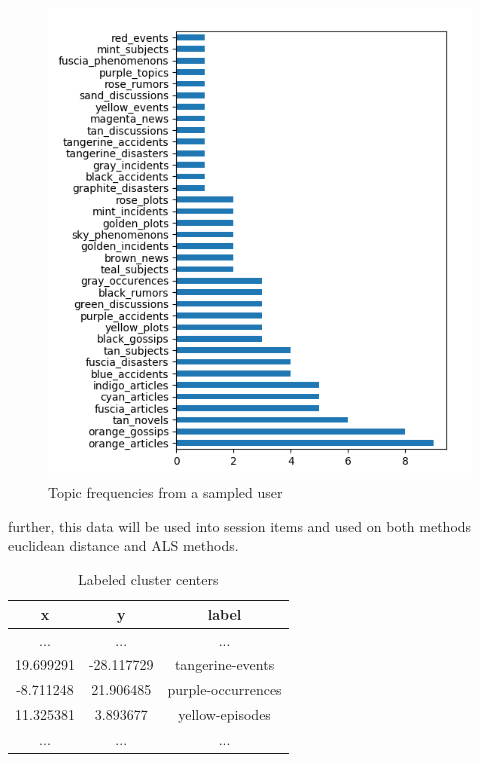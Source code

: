 \documentclass[ecp,tc,english]{iiufrgs}
\begin{document}
        \begin{figure}[!ht]
            \centering
            \includegraphics{images/frequencies.png}
            \caption{Topic frequencies from a sampled user}
            \label{fig:topic_frequency}
        \end{figure}
        
    
        further, this data will be used into session items and used on both methods euclidean distance and ALS methods.
        
        \begin{table}[!ht]
            \centering
                \begin{tabular}{ |c|c|c| } 
                \hline
                x & y & label \\
                \hline 
                ... & ...  & ... \\
                19.699291 & -28.117729 & tangerine-events \\ 
                -8.711248 & 21.906485 & purple-occurrences \\ 
                11.325381 & 3.893677 & yellow-episodes \\ 
                ... & ...  & ...  \\
                \hline
                \end{tabular}
            \caption{Labeled cluster centers}
            \label{tab:labeled_clusters}
        \end{table}
\end{document}
